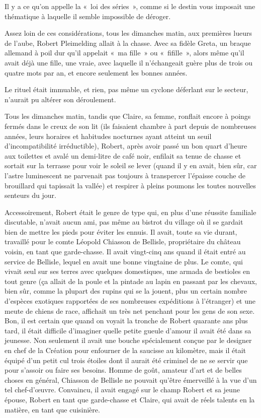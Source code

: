 
Il y a ce qu’on appelle la «~loi des séries~», comme si le destin vous imposait une thématique à laquelle il semble impossible de déroger.

\illusloflabel{}%
Assez loin de ces considérations, tous les dimanches matin, aux premières lueurs de l’aube, Robert Pleimelding allait à la chasse. Avec sa fidèle Greta, un braque allemand à poil dur qu’il appelait «~ma fille~» ou «~fifille~», alors même qu’il avait déjà une fille, une vraie, avec laquelle il n’échangeait guère plus de trois ou quatre mots par an, et encore seulement les bonnes années.

Le rituel était immuable, et rien, pas même un cyclone déferlant sur le secteur, n’aurait pu altérer son déroulement.

Tous les dimanches matin, tandis que Claire, sa femme, ronflait encore à poings fermés dans le creux de son lit (ils faisaient chambre à part depuis de nombreuses années, leurs horaires et habitudes nocturnes ayant atteint un seuil d’incompatibilité irréductible), Robert, après avoir passé un bon quart d’heure aux toilettes et avalé un demi-litre de café noir, enfilait sa tenue de chasse et sortait sur la terrasse pour voir le soleil se lever (quand il y en avait, bien sûr, car l’astre luminescent ne parvenait pas toujours à transpercer l’épaisse couche de brouillard qui tapissait la vallée) et respirer à pleins poumons les toutes nouvelles senteurs du jour.

Accessoirement, Robert était le genre de type qui, en plus d’une réussite familiale discutable, n’avait aucun ami, pas même au bistrot du village où il se gardait bien de mettre les pieds pour éviter les ennuis. Il avait, toute sa vie durant, travaillé pour le comte Léopold Chiasson de Bellisle, propriétaire du château voisin, en tant que garde-chasse. Il avait vingt-cinq ans quand il était entré au service de Bellisle, lequel en avait une bonne vingtaine de plus. Le comte, qui vivait seul sur ses terres avec quelques domestiques, une armada de bestioles en tout genre (ça allait de la poule et la pintade au lapin en passant par les chevaux, bien sûr, comme la plupart des rupins qui se la jouent, plus un certain nombre d’espèces exotiques rapportées de ses nombreuses expéditions à l’étranger) et une meute de chiens de race, affichait un très net penchant pour les gens de son sexe. Bon, il est certain que quand on voyait la tronche de Robert quarante ans plus tard, il était difficile d’imaginer quelle petite gueule d’amour il avait été dans sa jeunesse. Non seulement il avait une bouche spécialement conçue par le designer en chef de la Création pour enfourner de la saucisse au kilomètre, mais il était équipé d’un petit cul trois étoiles dont il aurait été criminel de ne se servir que pour s’assoir ou faire ses besoins. Homme de goût, amateur d’art et de belles choses en général, Chiasson de Bellisle ne pouvait qu’être émerveillé à la vue d’un tel chef-d’œuvre. Convaincu, il avait engagé sur le champ Robert et sa jeune épouse, Robert en tant que garde-chasse et Claire, qui avait de réels talents en la matière, en tant que cuisinière.

